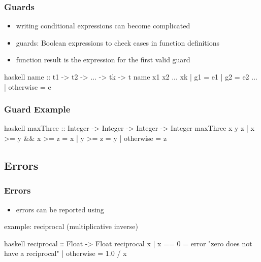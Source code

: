 \documentclass[dvipsnames]{beamer}
\theoremstyle{plain}
\begin{document}
\begin{frame}[fragile]
  \frametitle{Guards}

  \begin{itemize}
    \item writing conditional expressions can become complicated
    \item \alert{guards}: Boolean expressions to check cases
      in function definitions
    \item function result is the expression for the first valid guard
  \end{itemize}

  \begin{block}{}
    \begin{pygments}{haskell}
name :: t1 -> t2 -> ... -> tk -> t
name x1 x2 ... xk
  | g1        = e1
  | g2        = e2
    ...
  | otherwise = e
    \end{pygments}
  \end{block}
\end{frame}

\begin{frame}[fragile]
  \frametitle{Guard Example}

  \begin{exampleblock}{}
    \begin{pygments}{haskell}
maxThree :: Integer -> Integer -> Integer -> Integer
maxThree x y z
  | x >= y && x >= z = x
  | y >= z           = y
  | otherwise        = z
    \end{pygments}
  \end{exampleblock}
\end{frame}

\subsection{Errors}

\begin{frame}[fragile]
  \frametitle{Errors}

  \begin{itemize}
    \item errors can be reported using 
  \end{itemize}

  \begin{exampleblock}{example: reciprocal (multiplicative inverse)}
    \begin{pygments}{haskell}
reciprocal :: Float -> Float
reciprocal x
  | x == 0    = error "zero does not have a reciprocal"
  | otherwise = 1.0 / x
    \end{pygments}
  \end{exampleblock}
\end{frame}
\end{document}
